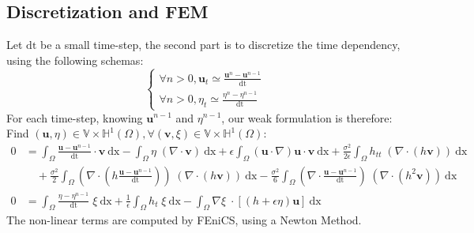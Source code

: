 \documentclass[11pt,a4paper]{article}
\begin{document}
			\pagebreak
		\subsection{Discretization and FEM}	
		Let $\mathrm{dt}$ be a small time-step, the second part is to discretize the time 
		dependency, using the following schemas:	
		\begin{equation}
			\left\lbrace
				\begin{array}{l}
					\displaystyle \forall n > 0, \mathbf{u}_t \simeq
					\frac{\mathbf{u}^n-\mathbf{u}^{n-1}}{\mathrm{dt}}  \\
					\displaystyle \forall n > 0, \eta_t \simeq \frac{\eta^n - \eta^{n-1}}
					{\mathrm{dt}}  
				\end{array}
			\right.
		\end{equation}
		For each time-step, knowing $\mathbf{u}^{n-1}$ and $\eta^{n-1}$, our weak 
		formulation is therefore: Find $(\mathbf{u},\eta) \in \mathbb{V} \times 
		\mathbb{H}^1(\Omega), \forall (\mathbf{v},\xi) \in \mathbb{V} \times 
		\mathbb{H}^1(\Omega)$: 
		\begin{equation}
			\begin{split}
				0 &= \int_{\Omega} \! \frac{\mathbf{u} 
					- \mathbf{u}^{n-1}}{\mathrm{dt}} \cdot
					\mathbf{v} \: \mathrm{dx} 
					- \int_{\Omega} \! \eta \; (\nabla \cdot \mathbf{v}) \: \mathrm{dx} +
					\epsilon \! \int_{\Omega} \! (\mathbf{u} \cdot \nabla ) \mathbf{u} \cdot 
					\mathbf{v} \: \mathrm{dx} + \frac{\sigma^2}{2 \epsilon} \! \int_{\Omega} \!  
					h_{tt}  \; (\nabla \cdot( h \mathbf{v})) \: \mathrm{dx} \\ 
					&\quad + \frac{\sigma^2}{2} \! \int_{\Omega} \!  (\nabla \cdot (h 
					\frac{\mathbf{u} - \mathbf{u}^{n-1}}{\mathrm{dt}})) \; (\nabla \cdot (h 
					\mathbf{v}) )\: \mathrm{dx} - \frac{\sigma^2}{6} \! \int_{\Omega} \! (\nabla 
					\cdot \frac{\mathbf{u} - \mathbf{u}^{n-1}}{\mathrm{dt}}) \; (\nabla  \cdot 
					(h^2  \mathbf{v})) \: \mathrm{dx} \\
					\displaystyle 0 &= \int_{\Omega}\! \frac{\eta - \eta^{n-1}}{\mathrm{dt}} \; 
					\xi \: \mathrm{dx} +\frac{1}{\epsilon}\int_{\Omega}\! h_t \; \xi \: 
					\mathrm{dx}
					-\int_{\Omega}\! \nabla \xi \; \cdot [(h+\epsilon\eta) \mathbf{u}]  \: 
					\mathrm{dx}
				\end{split}
			\end{equation}
			The non-linear terms are computed by FEniCS, using a Newton Method. 
			\cite{LoggMardalEtAl2012a}
			\cite{LoggWellsEtAl2012a}
			\cite{LoggWells2010a}
			
\end{document}
